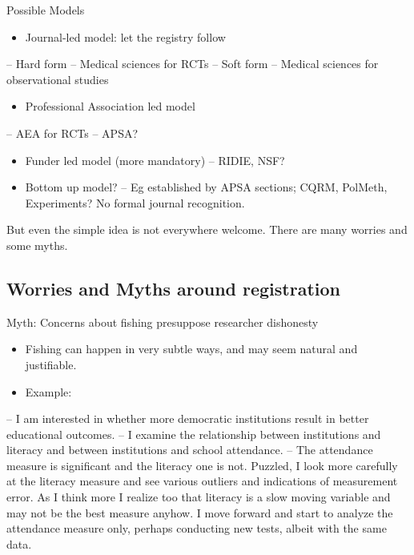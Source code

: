\documentclass[
  11pt,
  ignorenonframetext,
]{beamer}
\providecommand{\tightlist}{%
  \setlength{\itemsep}{0pt}\setlength{\parskip}{0pt}}\usepackage{longtable,booktabs,array}
\begin{document}
\begin{frame}{Possible Models}
\protect\hypertarget{possible-models}{}
\begin{itemize}
\tightlist
\item
  Journal-led model: let the registry follow
\end{itemize}

-- Hard form -- Medical sciences for RCTs -- Soft form -- Medical
sciences for observational studies

\begin{itemize}
\tightlist
\item
  Professional Association led model
\end{itemize}

-- AEA for RCTs -- APSA?

\begin{itemize}
\item
  Funder led model (more mandatory) -- RIDIE, NSF?
\item
  Bottom up model? -- Eg established by APSA sections; CQRM, PolMeth,
  Experiments? No formal journal recognition.
\end{itemize}

But even the simple idea is not everywhere welcome. There are many
worries and some myths.
\end{frame}

\hypertarget{worries-and-myths-around-registration}{%
\subsection{Worries and Myths around
registration}\label{worries-and-myths-around-registration}}

\begin{frame}{Myth: Concerns about fishing presuppose researcher
dishonesty}
\protect\hypertarget{myth-concerns-about-fishing-presuppose-researcher-dishonesty}{}
\begin{itemize}
\item
  Fishing can happen in very subtle ways, and may seem natural and
  justifiable.
\item
  Example:
\end{itemize}

-- I am interested in whether more democratic institutions result in
better educational outcomes. -- I examine the relationship between
institutions and literacy and between institutions and school
attendance. -- The attendance measure is significant and the literacy
one is not. Puzzled, I look more carefully at the literacy measure and
see various outliers and indications of measurement error. As I think
more I realize too that literacy is a slow moving variable and may not
be the best measure anyhow. I move forward and start to analyze the
attendance measure only, perhaps conducting new tests, albeit with the
same data.
\end{frame}
\end{document}
